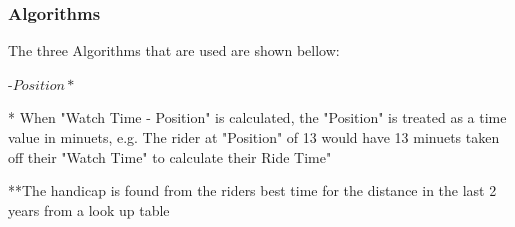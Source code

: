 \subsubsection{Algorithms}
The three Algorithms that are used are shown bellow:

\begin{algorithm}[H]
\label{fig:Ride Time Algorithm}
	\caption{$Ride Time Algorithum$}
\begin{algorithmic}[1]
-{$Position*$}
\end{algorithmic}
\end{algorithm}

* When "Watch Time - Position" is calculated, the "Position" is treated as a time value in minuets, e.g. The rider at "Position" of 13 would have 13 minuets taken off their "Watch Time" to calculate their Ride Time"

\begin{algorithm}[H]
\label{fig:Time Sort Algorithm}
	\caption{$Time Sort Algorithm$}
\begin{algorithmic}[2]
		\EndIf
	\EndFor
\EndWhile
\end{algorithmic}
\end{algorithm}

\begin{algorithm}[H]
\label{fig:Handicap Time Algorithm}
	\caption{$Handicap Time Algorithm$}
\begin{algorithmic}[3]
\end{algorithmic}
\end{algorithm}

**The handicap is found from the riders best time for the distance in the last 2 years from a look up table
